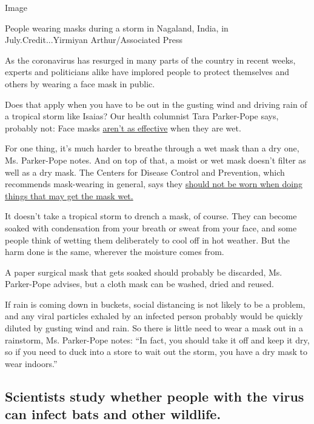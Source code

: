 Image

People wearing masks during a storm in Nagaland, India, in
July.Credit...Yirmiyan Arthur/Associated Press

As the coronavirus has resurged in many parts of the country in recent
weeks, experts and politicians alike have implored people to protect
themselves and others by wearing a face mask in public.

Does that apply when you have to be out in the gusting wind and driving
rain of a tropical storm like Isaias? Our health columnist Tara
Parker-Pope says, probably not: Face masks
\href{https://www.nursingtimes.net/clinical-archive/infection-control/the-effectiveness-of-surgical-face-masks-what-the-literature-shows-30-09-2003/}{aren't
as effective} when they are wet.

For one thing, it's much harder to breathe through a wet mask than a dry
one, Ms. Parker-Pope notes. And on top of that, a moist or wet mask
doesn't filter as well as a dry mask. The Centers for Disease Control
and Prevention, which recommends mask-wearing in general, says they
\href{https://www.cdc.gov/coronavirus/2019-ncov/prevent-getting-sick/cloth-face-cover-guidance.html}{should
not be worn when doing things that may get the mask wet.}

It doesn't take a tropical storm to drench a mask, of course. They can
become soaked with condensation from your breath or sweat from your
face, and some people think of wetting them deliberately to cool off in
hot weather. But the harm done is the same, wherever the moisture comes
from.

A paper surgical mask that gets soaked should probably be discarded, Ms.
Parker-Pope advises, but a cloth mask can be washed, dried and reused.

If rain is coming down in buckets, social distancing is not likely to be
a problem, and any viral particles exhaled by an infected person
probably would be quickly diluted by gusting wind and rain. So there is
little need to wear a mask out in a rainstorm, Ms. Parker-Pope notes:
``In fact, you should take it off and keep it dry, so if you need to
duck into a store to wait out the storm, you have a dry mask to wear
indoors.''

\hypertarget{scientists-study-whether-people-with-the-virus-can-infect-bats-and-other-wildlife}{%
\subsection{Scientists study whether people with the virus can infect
bats and other
wildlife.}\label{scientists-study-whether-people-with-the-virus-can-infect-bats-and-other-wildlife}}

